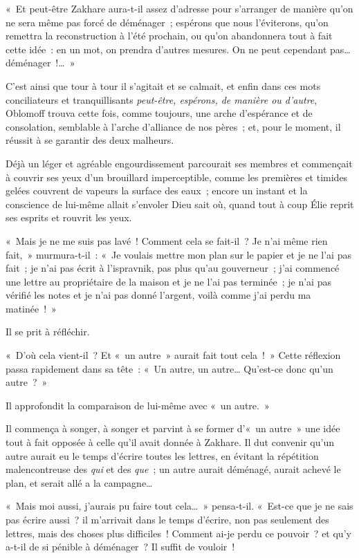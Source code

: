 \documentclass[french,twoside]{book} %
\begin{document}
« Et peut-être Zakhare aura-t-il assez d’adresse pour s’arranger de manière qu’on ne sera même pas forcé de déménager ; espérons que nous l’éviterons, qu’on remettra la reconstruction à l’été prochain, ou qu’on abandonnera tout à fait cette idée : en un mot, on prendra d’autres mesures. On ne peut cependant pas… déménager !… »\par
C’est ainsi que tour à tour il s’agitait et se calmait, et enfin dans ces mots conciliateurs et tranquillisants \emph{peut-être, espérons, de manière ou d’autre}, Oblomoff trouva cette fois, comme toujours, une arche d’espérance et de consolation, semblable à l’arche d’alliance de nos pères ; et, pour le moment, il réussit à se garantir des deux malheurs.\par
Déjà un léger et agréable engourdissement parcourait ses membres et commençait à couvrir ses yeux d’un brouillard imperceptible, comme les premières et timides gelées couvrent de vapeurs la surface des eaux ; encore un instant et la conscience de lui-même allait s’envoler Dieu sait où, quand tout à coup Élie reprit ses esprits et rouvrit les yeux.\par
« Mais je ne me suis pas lavé ! Comment cela se fait-il ? Je n’ai même rien fait, » murmura-t-il : « Je voulais mettre mon plan sur le papier et je ne l’ai pas fait ; je n’ai pas écrit à l’ispravnik, pas plus qu’au gouverneur ; j’ai commencé une lettre au propriétaire de la maison et je ne l’ai pas terminée ; je n’ai pas vérifié les notes et je n’ai pas donné l’argent, voilà comme j’ai perdu ma matinée ! »\par
Il se prit à réfléchir.\par
« D’où cela vient-il ? Et « un autre » aurait fait tout cela ! » Cette réflexion passa rapidement dans sa tête : « Un autre, un autre… Qu’est-ce donc qu’un autre ? »\par
Il approfondit la comparaison de lui-même avec « un autre. »\par
Il commença à songer, à songer et parvint à se former d’« un autre » une idée tout à fait opposée à celle qu’il avait donnée à Zakhare. Il dut convenir qu’un autre aurait eu le temps d’écrire toutes les lettres, en évitant la répétition malencontreuse des \emph{qui} et des \emph{que} ; un autre aurait déménagé, aurait achevé le plan, et serait allé a la campagne…\par
« Mais moi aussi, j’aurais pu faire tout cela… » pensa-t-il. « Est-ce que je ne sais pas écrire aussi ? il m’arrivait dans le temps d’écrire, non pas seulement des lettres, mais des choses plus difficiles ! Comment ai-je perdu ce pouvoir ? et qu’y a-t-il de si pénible à déménager ? Il suffit de vouloir !\par
\end{document}
